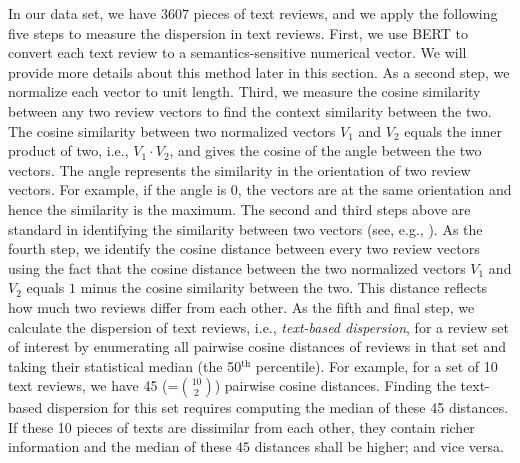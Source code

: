\documentclass[msom,blindrev]{informs3}
\begin{document}
	In our data set, we have $3607$ pieces of text reviews, and we apply the following five steps to measure the dispersion in text reviews. First, we use BERT to convert each text review to a semantics-sensitive numerical vector. We will provide more details about this method later in this section.  As a second step, we normalize each vector to unit length. Third, we measure the cosine similarity between any two review vectors to find the context similarity between the two. The cosine similarity between two normalized vectors $V_{1}$ and $V_{2}$ equals the inner product of two, i.e., $V_1 \cdot V_2$, and gives the cosine of the angle between the two vectors. The angle represents the similarity in the orientation of two review vectors. For example, if the angle is $0$, the vectors are at the same orientation and hence the similarity is the maximum. The second and third steps above are standard in identifying the similarity between two vectors (see, e.g., \cite{hoberg2016text}). As the fourth step, we identify the cosine distance between every two review vectors using the fact that the cosine distance between the two normalized vectors $V_{1}$ and $V_{2}$ equals $1$ minus the cosine similarity between the two. This distance reflects how much two reviews differ from each other. As the fifth and final step, we calculate the dispersion of text reviews, i.e., \emph{text-based dispersion}, for a review set of interest by enumerating all pairwise cosine distances of reviews in that set and taking their statistical median (the 50$^{\text{th}}$ percentile). For example, for a set of 10 text reviews, we have 45 (=$\binom{10}{2}$) pairwise cosine distances. Finding the text-based dispersion for this set requires computing the median of these 45 distances. If these 10 pieces of texts are dissimilar from each other, they contain richer information and the median of these $45$ distances shall be higher; and vice versa.
	
\end{document}
